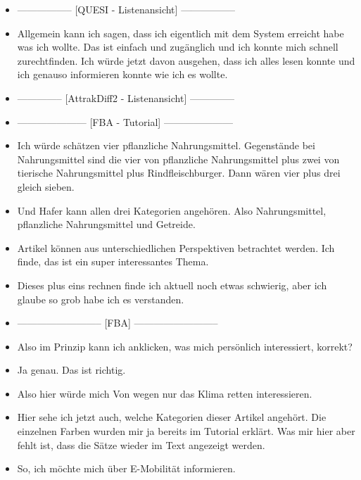 {\begin{itemize}[]
              Wenn ich jedoch mehr dazu wüsste, könnte es sein, dass ich das jetzt nicht so auswählen würde.
        \item {-----------------} [QUESI - Listenansicht] {-----------------}
        \item {} Allgemein kann ich sagen, dass ich eigentlich mit dem System erreicht habe was ich wollte.
              Das ist einfach und zugänglich und ich konnte mich schnell zurechtfinden.
              Ich würde jetzt davon ausgehen, dass ich alles lesen konnte und ich genauso informieren konnte wie ich es wollte.
        \item {--------------} [AttrakDiff2 - Listenansicht] {--------------}
        \item {---------------------} [FBA - Tutorial] {---------------------}
        \item {} Ich würde schätzen vier pflanzliche Nahrungsmittel.
              Gegenstände bei Nahrungsmittel sind die vier von pflanzliche Nahrungsmittel plus zwei von tierische Nahrungsmittel plus Rindfleischburger.
              Dann wären vier plus drei gleich sieben.
        \item {} Und Hafer kann allen drei Kategorien angehören. Also Nahrungsmittel, pflanzliche Nahrungsmittel und Getreide.
        \item {} Artikel können aus unterschiedlichen Perspektiven betrachtet werden. Ich finde, das ist ein super interessantes Thema.
        \item {} Dieses plus eins rechnen finde ich aktuell noch etwas schwierig, aber ich glaube so grob habe ich es verstanden.
        \item {--------------------------} [FBA] {--------------------------}
        \item {} Also im Prinzip kann ich anklicken, was mich persönlich interessiert, korrekt?
        \item {} Ja genau. Das ist richtig.
        \item {} Also hier würde mich \flqq Von wegen nur das Klima retten\frqq{} interessieren.
        \item {} Hier sehe ich jetzt auch, welche Kategorien dieser Artikel angehört.
              Die einzelnen Farben wurden mir ja bereits im Tutorial erklärt.
              Was mir hier aber fehlt ist, dass die Sätze wieder im Text angezeigt werden.
        \item {} So, ich möchte mich über E-Mobilität informieren.

\end{itemize}}
